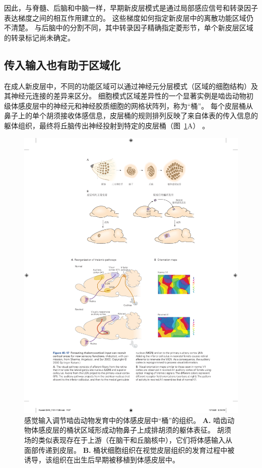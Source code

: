 因此，与脊髓、后脑和中脑一样，早期新皮层模式是通过局部感应信号和转录因子表达梯度之间的相互作用建立的。
这些梯度如何指定新皮层中的离散功能区域仍不清楚。
与后脑中的分割不同，其中转录因子精确指定菱形节，单个新皮层区域的转录标记尚未确定。



\subsection{传入输入也有助于区域化}

在成人新皮层中，不同的功能区域可以通过神经元分层模式（区域的细胞结构）及其神经元连接的差异来区分。
细胞模式区域差异性的一个显著实例是啮齿动物初级体感皮层中的神经元和神经胶质细胞的网格状阵列，称为“桶”。
每个皮层桶从鼻子上的单个胡须接收体感信息，皮层桶的规则排列反映了来自体表的传入信息的躯体组织，最终将丘脑传出神经投射到特定的皮层桶（图~\ref{fig:45_16}A） 。


\begin{figure}[htbp]
	\centering
	\includegraphics[width=0.86\linewidth]{chap45/fig_45_16}
	\caption{感觉输入调节啮齿动物发育中的体感皮层中“桶”的组织\cite{schlaggar1991potential}。
		\textbf{A.} 啮齿动物体感皮层的桶状区域形成动物鼻子上成排胡须的躯体表征。
		胡须场的类似表现存在于上游（在脑干和丘脑核中），它们将体感输入从面部传递到皮层。
		\textbf{B.} 桶状细胞组织在视觉皮层组织的发育过程中被诱导，该组织在出生后早期被移植到体感皮层中。}
	\label{fig:45_16}
\end{figure}


